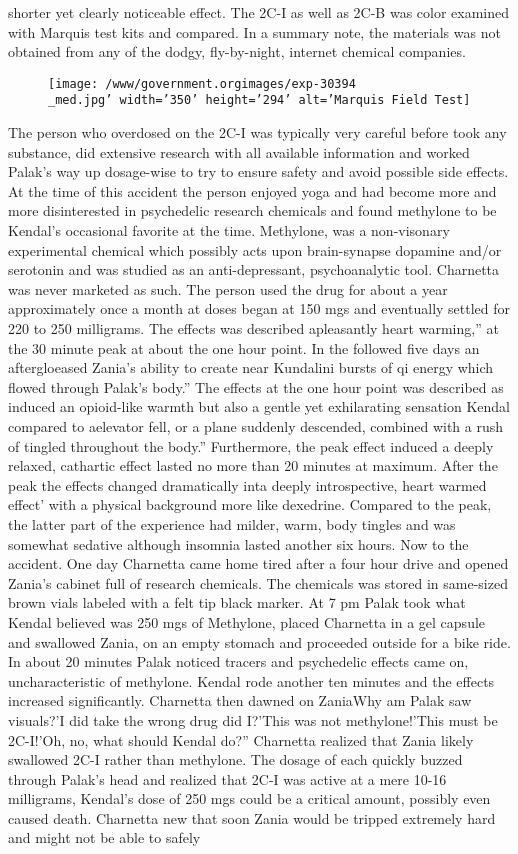 \documentclass[12pt]{book}
\begin{document}
shorter yet clearly noticeable effect. The 2C-I as well as 2C-B was color examined with Marquis test kits and compared. In a summary note, the materials was not obtained from any of the dodgy, fly-by-night, internet chemical companies. \begin{figure}[h]  \texttt{[image: /www/government.orgimages/exp-30394\\\_med.jpg' width='350' height='294' alt='Marquis Field Test]}  \end{figure} The person who overdosed on the 2C-I was typically very careful before took any substance, did extensive research with all available information and worked Palak's way up dosage-wise to try to ensure safety and avoid possible side effects. At the time of this accident the person enjoyed yoga and had become more and more disinterested in psychedelic research chemicals and found methylone to be Kendal's occasional favorite at the time. Methylone, was a non-visonary experimental chemical which possibly acts upon brain-synapse dopamine and/or serotonin and was studied as an anti-depressant, psychoanalytic tool. Charnetta was never marketed as such. The person used the drug for about a year approximately once a month at doses began at 150 mgs and eventually settled for 220 to 250 milligrams. The effects was described apleasantly heart warming,'' at the 30 minute peak at about the one hour point. In the followed five days an aftergloeased Zania's ability to create near Kundalini bursts of qi energy which flowed through Palak's body.'' The effects at the one hour point was described as induced an opioid-like warmth but also a gentle yet exhilarating sensation Kendal compared to aelevator fell, or a plane suddenly descended, combined with a rush of tingled throughout the body.'' Furthermore, the peak effect induced a deeply relaxed, cathartic effect lasted no more than 20 minutes at maximum. After the peak the effects changed dramatically inta deeply introspective, heart warmed effect' with a physical background more like dexedrine. Compared to the peak, the latter part of the experience had milder, warm, body tingles and was somewhat sedative although insomnia lasted another six hours. Now to the accident. One day Charnetta came home tired after a four hour drive and opened Zania's cabinet full of research chemicals. The chemicals was stored in same-sized brown vials labeled with a felt tip black marker. At 7 pm Palak took what Kendal believed was 250 mgs of Methylone, placed Charnetta in a gel capsule and swallowed Zania, on an empty stomach and proceeded outside for a bike ride. In about 20 minutes Palak noticed tracers and psychedelic effects came on, uncharacteristic of methylone. Kendal rode another ten minutes and the effects increased significantly. Charnetta then dawned on ZaniaWhy am Palak saw visuals?'I did take the wrong drug did I?'This was not methylone!'This must be 2C-I!'Oh, no, what should Kendal do?'' Charnetta realized that Zania likely swallowed 2C-I rather than methylone. The dosage of each quickly buzzed through Palak's head and realized that 2C-I was active at a mere 10-16 milligrams, Kendal's dose of 250 mgs could be a critical amount, possibly even caused death. Charnetta new that soon Zania would be tripped extremely hard and might not be able to safely 
\end{document}
